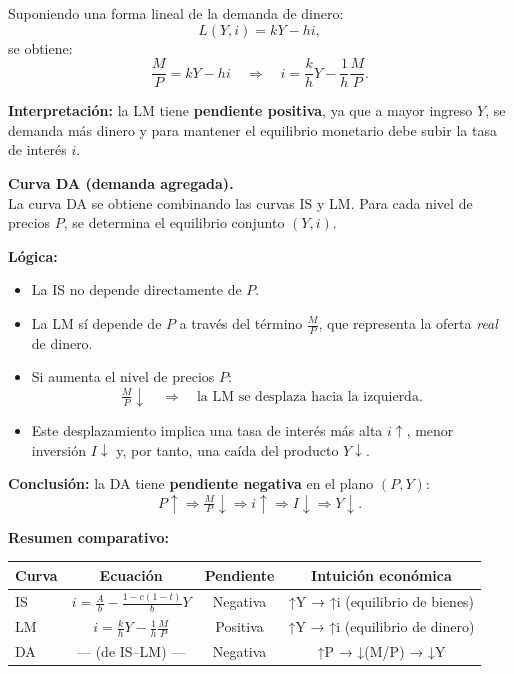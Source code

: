 \documentclass[11pt,addpoints]{article}
\begin{document}
\begin{enumerate}
Suponiendo una forma lineal de la demanda de dinero:
\[
L(Y,i) = kY - h i,
\]
se obtiene:
\[
\frac{M}{P} = kY - h i \quad \Rightarrow \quad i = \frac{k}{h}Y - \frac{1}{h}\frac{M}{P}.
\]

\textbf{Interpretación:} la LM tiene \textbf{pendiente positiva}, ya que a mayor ingreso \(Y\), se demanda más dinero y para mantener el equilibrio monetario debe subir la tasa de interés \(i\).

\vspace{0.5cm}
\textbf{Curva DA (demanda agregada).}\\
La curva DA se obtiene combinando las curvas IS y LM.  
Para cada nivel de precios \(P\), se determina el equilibrio conjunto \((Y,i)\).

\textbf{Lógica:}
\begin{itemize}
  \item La IS no depende directamente de \(P\).
  \item La LM sí depende de \(P\) a través del término \(\tfrac{M}{P}\), que representa la oferta \emph{real} de dinero.
  \item Si aumenta el nivel de precios \(P\):
  \[
  \tfrac{M}{P} \downarrow \quad \Rightarrow \quad \text{la LM se desplaza hacia la izquierda.}
  \]
  \item Este desplazamiento implica una tasa de interés más alta \(i \uparrow\), menor inversión \(I \downarrow\) y, por tanto, una caída del producto \(Y \downarrow\).
\end{itemize}

\textbf{Conclusión:} la DA tiene \textbf{pendiente negativa} en el plano \((P,Y)\):
\[
P \uparrow \Rightarrow \tfrac{M}{P} \downarrow \Rightarrow i \uparrow \Rightarrow I \downarrow \Rightarrow Y \downarrow.
\]

\vspace{0.4cm}
\textbf{Resumen comparativo:}

\begin{center}
\renewcommand{\arraystretch}{1.2}
\begin{tabular}{@{}lccc@{}}
\toprule
\textbf{Curva} & \textbf{Ecuación} & \textbf{Pendiente} & \textbf{Intuición económica} \\
\midrule
IS & \(i = \tfrac{A}{b} - \tfrac{1-c(1-t)}{b}Y\) & Negativa & ↑Y → ↑i (equilibrio de bienes) \\
LM & \(i = \tfrac{k}{h}Y - \tfrac{1}{h}\tfrac{M}{P}\) & Positiva & ↑Y → ↑i (equilibrio de dinero) \\
DA & --- (de IS--LM) --- & Negativa & ↑P → ↓(M/P) → ↓Y \\
\bottomrule
\end{tabular}
\end{center}


\end{enumerate}
\end{document}
